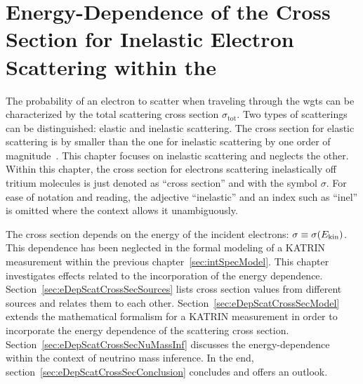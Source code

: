 \def\currentRootFolder{chapter/energyDependentCrossSec}
\def\currentFigureFolder{\currentRootFolder/fig}


\chapter{Energy-Dependence of the Cross Section for Inelastic Electron Scattering within the }
\label{sec:eDepScatCrossSec}
The probability of an electron to scatter when traveling through the \gls{wgts} can be characterized by the total scattering cross section $\sigma_\mathrm{tot}$. Two types of scatterings can be distinguished: elastic and inelastic scattering. The cross section for elastic scattering is by smaller than the one for inelastic scattering by one order of magnitude~\cite{Kleesiek2019}. This chapter focuses on inelastic scattering and neglects the other. Within this chapter, the cross section for electrons scattering inelastically off tritium molecules is just denoted as ``cross section'' and with the symbol $\sigma$. For ease of notation and reading, the adjective ``inelastic'' and an index such as ``inel'' is omitted where the context allows it unambiguously.

The cross section depends on the energy of the incident electrons: $\sigma \equiv \sigma(E_\mathrm{kin})$. This dependence has been neglected in the formal modeling of a KATRIN measurement within the previous chapter~\ref{sec:intSpecModel}. This chapter investigates effects related to the incorporation of the energy dependence. Section~\ref{sec:eDepScatCrossSecSources} lists cross section values from different sources and relates them to each other. Section~\ref{sec:eDepScatCrossSecModel} extends the mathematical formalism for a KATRIN measurement in order to incorporate the energy dependence of the scattering cross section. Section~\ref{sec:eDepScatCrossSecNuMassInf} discusses the energy-dependence within the context of neutrino mass inference. In the end, section~\ref{sec:eDepScatCrossSecConclusion} concludes and offers an outlook.


